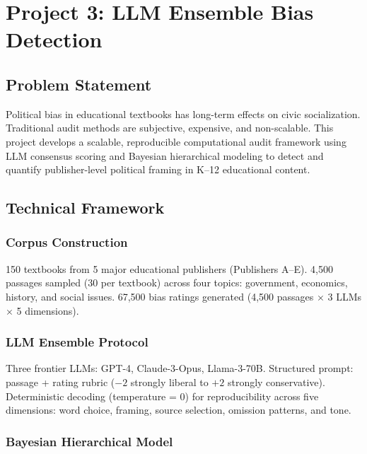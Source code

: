 \documentclass[11pt,a4paper]{article}
\begin{document}
\section{Project 3: LLM Ensemble Bias Detection}

\subsection{Problem Statement}

Political bias in educational textbooks has long-term effects on civic socialization. Traditional audit methods are subjective, expensive, and non-scalable. This project develops a scalable, reproducible computational audit framework using LLM consensus scoring and Bayesian hierarchical modeling to detect and quantify publisher-level political framing in K--12 educational content.

\subsection{Technical Framework}

\subsubsection{Corpus Construction}

150 textbooks from 5 major educational publishers (Publishers A--E). 4,500 passages sampled (30 per textbook) across four topics: government, economics, history, and social issues. 67,500 bias ratings generated (4,500 passages $\times$ 3 LLMs $\times$ 5 dimensions).

\subsubsection{LLM Ensemble Protocol}

Three frontier LLMs: GPT-4, Claude-3-Opus, Llama-3-70B. Structured prompt: passage + rating rubric ($-2$ strongly liberal to $+2$ strongly conservative). Deterministic decoding (temperature = 0) for reproducibility across five dimensions: word choice, framing, source selection, omission patterns, and tone.

\subsubsection{Bayesian Hierarchical Model}
\end{document}
